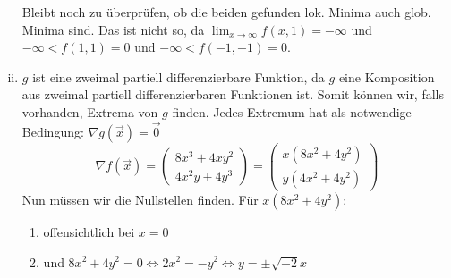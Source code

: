 \documentclass[10pt,a4paper,parskip=half]{scrartcl}
\begin{document}
\begin{enumerate}[(i)]
	Bleibt noch zu überprüfen, ob die beiden gefunden lok. Minima auch glob. Minima sind.
	Das ist nicht so, da $\lim_{x \to \infty} f(x,1) = -\infty$ und $-\infty < f(1,1) = 0$ und $-\infty < f(-1,-1) = 0$.
	
	\item	
\(g\) ist eine zweimal partiell differenzierbare Funktion, da \(g\) eine Komposition aus zweimal partiell differenzierbaren Funktionen ist. Somit können wir, falls vorhanden, Extrema von $g$ finden. Jedes Extremum hat als notwendige Bedingung: $\nabla g(\vec x) = \vec 0$
	\[ \nabla f (\vec x) = 
	\begin{pmatrix}
		8x^3  +4xy^2\\
		 4x^2y + 4y^3
	\end{pmatrix} =  
	\begin{pmatrix}
		x(8x^2+4y^2) \\
		y(4x^2 +  4y^2)
	\end{pmatrix}  \]
Nun müssen wir die Nullstellen finden. Für $x(8x^2+4y^2)$:
\begin{enumerate}
\item offensichtlich bei $x=0$
\item und $8x^2+4y^2 = 0 \Leftrightarrow 2x^2 = -y^2 \Leftrightarrow y = \pm \sqrt{-2} x$
\end{enumerate}

	\end{enumerate}
\end{document}
